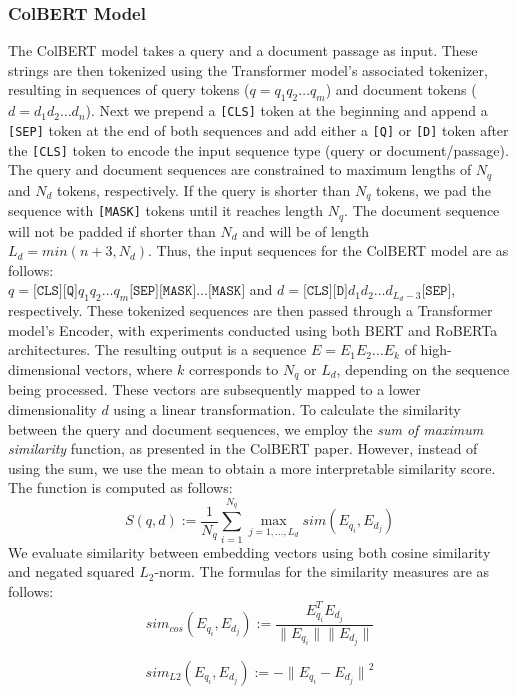 \documentclass[11pt]{article}
\begin{document}
\subsubsection{ColBERT Model}
The ColBERT model takes a query and a document passage as input. These strings are then tokenized using the Transformer model's associated tokenizer, resulting in sequences of query tokens ($q = q_1q_2\dots q_m$) and document tokens ($d = d_1d_2\dots d_n$). Next we prepend a \texttt{[CLS]} token at the beginning and append a \texttt{[SEP]} token at the end of both sequences and add either a \texttt{[Q]} or \texttt{[D]} token after the \texttt{[CLS]} token to encode the input sequence type (query or document/passage). The query and document sequences are constrained to maximum lengths of $N_q$ and $N_d$ tokens, respectively. If the query is shorter than $N_q$ tokens, we pad the sequence with \texttt{[MASK]} tokens until it reaches length $N_q$. The document sequence will not be padded if shorter than $N_d$ and will be of length $L_d = min(n + 3, N_d)$. Thus, the input sequences for the ColBERT model are as follows: \\ $q = \texttt{[CLS]}\texttt{[Q]}q_1q_2 \dots q_m\texttt{[SEP]}\texttt{[MASK]}\dots\texttt{[MASK]}$ and $d = \texttt{[CLS]}\texttt{[D]}d_1d_2 \dots d_{L_d-3}\texttt{[SEP]}$, respectively. These tokenized sequences are then passed through a Transformer model's Encoder, with experiments conducted using both BERT \cite{devlin2019bert} and RoBERTa \cite{liu2019roberta} architectures. The resulting output is a sequence $E = E_1E_2 \dots E_k$ of high-dimensional vectors, where $k$ corresponds to $N_q$ or $L_d$, depending on the sequence being processed. These vectors are subsequently mapped to a lower dimensionality $d$ using a linear transformation. To calculate the similarity between the query and document sequences, we employ the \textit{sum of maximum similarity} function, as presented in the ColBERT paper. However, instead of using the sum, we use the mean to obtain a more interpretable similarity score. The function is computed as follows:
$$ S(q,d) := \frac{1}{N_q} \sum_{i=1}^{N_q} \max_{j = 1, \dots, L_d} sim(E_{q_i}, E_{d_j})
$$
We evaluate similarity between embedding vectors using both cosine similarity and negated squared $L_2$-norm. The formulas for the similarity measures are as follows:
$$
sim_{cos}(E_{q_i}, E_{d_j}) := \frac{E_{q_i}^{T}E_{d_j} }{\| E_{q_i} \|\| E_{d_j} \|} 
$$

$$
sim_{L2}(E_{q_i}, E_{d_j}) := -{\| E_{q_i} -E_{d_j} \|}^2
$$
\end{document}

